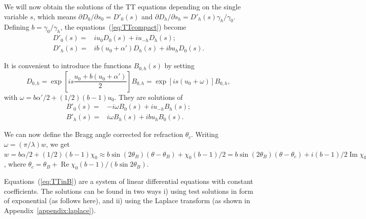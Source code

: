 \documentclass[preprint]{iucr}              %
\newcommand{\todo}[1]{{\color{red}[TODO: "#1'']}}
\newcommand{\inblue}[1]{{\color{blue}#1}}
\newcommand{\inred}[1]{{\color{red}#1}}
\begin{document}
We will now obtain the solutions of the TT equations depending on the single variable $s$, which means 
$\partial D_{0} / \partial  s_{0}=D'_{0}(s)$ and $\partial D_{h} / \partial s_{h}=D'_{h}(s)\gamma_h/\gamma_0$.
Defining $\boxed{b=\gamma_0/\gamma_h}$, the equations~(\ref{eq:TTcompact}) become
\begin{subequations}
\label{eq:TTlaue}
\begin{align}
D'_0(s) =& i u_0 D_0(s) + i u_{-h} D_h(s); \\
D'_h(s) =& i b (u_0 + \alpha') D_h(s) + i b u_{h} D_0(s).
\end{align}
\end{subequations}

It is convenient to introduce the functions $B_{0,h}(s)$ by setting
\begin{equation}
\label{eq:Bdefinition}
D_{0,h} = \exp \left[ i s \frac{u_0 + b (u_0+\alpha')}{2} \right] B_{0,h} = \exp[i s (u_0+\omega)] B_{0,h},  
\end{equation}
with
$\boxed{\omega=b \alpha'/2+ (1/2) (b-1) u_0}$. They are solutions of 
\begin{subequations}
\label{eq:TTinB}
\begin{align}
B'_0(s) =& -i \omega B_0(s) + i u_{-h} B_h(s); \\
B'_h(s) =& i \omega B_h(s) + i b u_{h} B_0(s).
\end{align}
\end{subequations}



We can now define the Bragg angle corrected for refraction $\theta_c$. Writing $\boxed{\omega=(\pi/\lambda) w}$, we get
$ w = b \alpha / 2 + (1/2) (b-1) \chi_0 \approx
b \sin(2\theta_B)(\theta-\theta_B)+\chi_0 (b-1)/2=
b \sin(2\theta_B)(\theta-\theta_c)+ i (b-1)/2 \operatorname{Im} \chi_0$, where $\theta_c=\theta_B+ \operatorname{Re}\chi_0(b-1)/(b \sin 2\theta_B) $.

Equations~(\ref{eq:TTinB}) are a system of linear differential equations with constant coefficients. The solutions can be found in two ways i) using test solutions in form of exponential (as follows here), and ii) using the Laplace transform (as shown in Appendix~\ref{appendix:laplace}).
\end{document}
